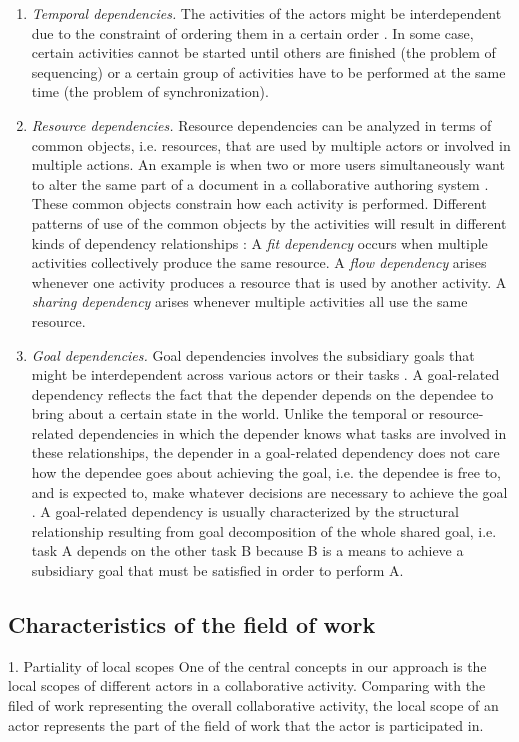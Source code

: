 \begin{enumerate}
	\item \emph{Temporal dependencies.} The activities of the actors might be interdependent due to the constraint of ordering them in a certain order \cite{sikora1998a}. In some case, certain activities cannot be started until others are finished (the problem of sequencing) or a certain group of activities have to be performed at the same time (the problem of synchronization).
	\item \emph{Resource dependencies.} Resource dependencies can be analyzed in terms of common objects, i.e. resources, that are used by multiple actors or involved in multiple actions. An example is when two or more users simultaneously want to alter the same part of a document in a collaborative authoring system \cite{berlage1999a}. These common objects constrain how each activity is performed. Different patterns of use of the common objects by the activities will result in different kinds of dependency relationships \cite{malone1990coordination}: A \emph{fit dependency} occurs when multiple activities collectively produce the same resource. A \emph{flow dependency} arises whenever one activity produces a resource that is used by another activity. A \emph{sharing dependency} arises whenever multiple activities all use the same resource.
	\item \emph{Goal dependencies.} Goal dependencies involves the subsidiary goals that might be interdependent across various actors or their tasks \cite{sikora1998a}. A goal-related dependency reflects the fact that the depender depends on the dependee to bring about a certain state in the world. Unlike the temporal or resource-related dependencies in which the depender knows what tasks are involved in these relationships, the depender in a goal-related dependency does not care how the dependee goes about achieving the goal, i.e. the dependee is free to, and is expected to, make whatever decisions are necessary to achieve the goal \cite{yu1993actor}. A goal-related dependency is usually characterized by the structural relationship resulting from goal decomposition of the whole shared goal, i.e. task A depends on the other task B because B is a means to achieve a subsidiary goal that must be satisfied in order to perform A.
\end{enumerate}

\subsection{Characteristics of the field of work} %
\label{sub:characteristics_of_the_field_of_work}
1. Partiality of local scopes
One of the central concepts in our approach is the local scopes of different actors in a collaborative activity. Comparing with the filed of work representing the overall collaborative activity, the local scope of an actor represents the part of the field of work that the actor is participated in. 

